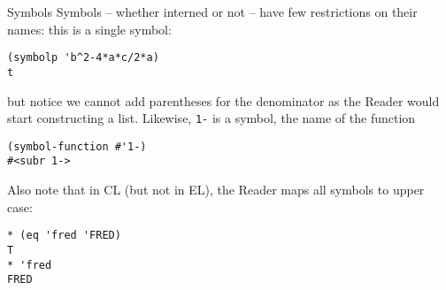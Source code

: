 \documentclass[presentation]{beamer}
\begin{document}
\begin{frame}[fragile]{Symbols}
Symbols -- whether interned or not -- have few restrictions on their names: this is a single symbol:
\begin{verbatim}
(symbolp 'b^2-4*a*c/2*a)
t
\end{verbatim}
but notice we cannot add parentheses for the denominator as the Reader would start constructing a list.  Likewise, \texttt{1-} is a symbol, the name of the function
\begin{verbatim}
(symbol-function #'1-)
#<subr 1->
\end{verbatim}
Also note that in CL (but not in EL), the Reader maps all symbols to upper case:
\begin{verbatim}
* (eq 'fred 'FRED)
T
* 'fred
FRED
\end{verbatim}
\end{frame}
\end{document}
